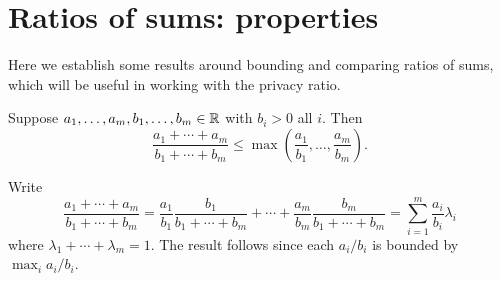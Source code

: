\documentclass[11pt,draft]{article}
\begin{document}
\section{Ratios of sums: properties}

Here we establish some results around bounding and comparing ratios of sums, which will be useful in working with the privacy ratio.


\begin{lem} \label{lem:rsbound}
Suppose $a_1,\dots,a_m,b_1,\dots,b_m \in \mathbb{R}$ with $b_i > 0$ all $i$.
Then 
\[ \frac{a_1 + \cdots + a_m}{b_1 + \cdots + b_m} \leq
\max\left(\frac{a_1}{b_1},\dots,\frac{a_m}{b_m}\right). \]
\end{lem}
\begin{pf}
Write
\[ \frac{a_1 + \cdots + a_m}{b_1 + \cdots + b_m}
= \frac{a_1}{b_1}\frac{b_1}{b_1+\cdots+b_m} +
\cdots + \frac{a_m}{b_m}\frac{b_m}{b_1+\cdots+b_m} =
\sum_{i=1}^m \frac{a_i}{b_i} \lambda_i
\]
where $\lambda_1 + \cdots + \lambda_m = 1$.
The result follows since each $a_i/b_i$ is bounded by $\max_i a_i/b_i$.
\end{pf}

\end{document}
